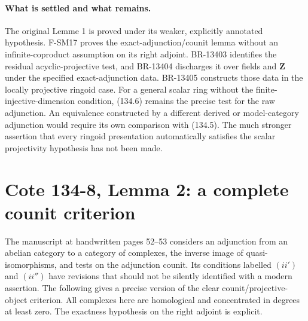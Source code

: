 \documentclass[11pt,a4paper]{article}
\theoremstyle{definition}\newtheorem{definition}[theorem]{Definition}
\theoremstyle{remark}\newtheorem{remark}[theorem]{Remark}
\begin{document}
\paragraph{What is settled and what remains.}
The original Lemme 1 is proved under its weaker, explicitly annotated
hypothesis.  F-SM17 proves the exact-adjunction/counit lemma without an
infinite-coproduct assumption on its right adjoint.  BR-13403 identifies
the residual acyclic-projective test, and BR-13404 discharges it over
fields and \(\mathbf Z\) under the specified exact-adjunction data.
BR-13405 constructs those data in the locally projective ringoid case.
For a general scalar ring without the finite-injective-dimension
condition, (134.6) remains the precise test for the raw adjunction.
An equivalence constructed by a different derived or model-category
adjunction would require its own comparison with (134.5).  The much
stronger assertion that every ringoid presentation automatically
satisfies the scalar projectivity hypothesis has not been made.



\section{Cote 134-8, Lemma 2: a complete counit criterion}
\label{sec:SM-cote1348-counit}

The manuscript at handwritten pages 52--53 considers an adjunction from
an abelian category to a category of complexes, the inverse image of
quasi-isomorphisms, and tests on the adjunction counit.  Its conditions
labelled $(ii')$ and $(ii'')$ have revisions that should not be
silently identified with a modern assertion.  The following gives a
precise version of the clear counit/projective-object criterion.  All
complexes here are homological and concentrated in degrees at least
zero.  The exactness hypothesis on the right adjoint is explicit.
\end{document}
